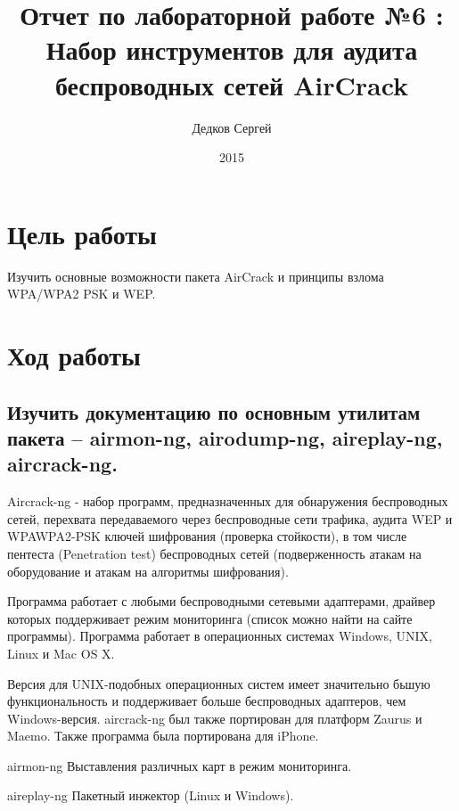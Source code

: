 \documentclass[11pt, a4paper]{article}		%
\author{Дедков Сергей}
\title{Отчет по лабораторной работе №6 :\\ Набор инструментов для аудита беспроводных сетей AirCrack}
\date{2015}
\begin{document}
\maketitle
\tableofcontents
\newpage



\section{Цель работы}

Изучить основные возможности пакета AirCrack и принципы взлома WPA/WPA2 PSK и WEP.




\section{Ход работы}



\subsection{Изучить документацию по основным утилитам пакета – airmon-ng, airodump-ng, aireplay-ng, aircrack-ng.}

Aircrack-ng - набор программ, предназначенных для обнаружения беспроводных сетей, перехвата передаваемого через беспроводные сети трафика, аудита WEP и WPAWPA2-PSK ключей шифрования (проверка стойкости), в том числе пентеста (Penetration test) беспроводных сетей (подверженность атакам на оборудование и атакам на алгоритмы шифрования).

Программа работает с любыми беспроводными сетевыми адаптерами, драйвер которых поддерживает режим мониторинга (список можно найти на сайте программы). Программа работает в операционных системах Windows, UNIX, Linux и Mac OS X. 

Версия для UNIX-подобных операционных систем имеет значительно бьшую функциональность и поддерживает больше беспроводных адаптеров, чем Windows-версия. aircrack-ng был также портирован для платформ Zaurus и Maemo. Также программа была портирована для iPhone.

airmon-ng	Выставления различных карт в режим мониторинга.

aireplay-ng	Пакетный инжектор (Linux и Windows).
\end{document}
